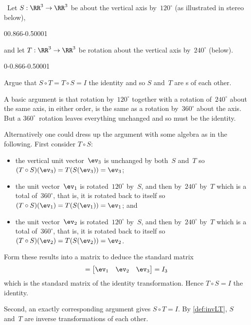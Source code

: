 \begin{example} \ 
Let \(S:\RR^3\to\RR^3\) be  about the vertical axis by~\(120^\circ\) (as illustrated in stereo below), 
\begin{center}
0{0.866}{-0.5}0001
\end{center}
and let \(T:\RR^3\to\RR^3\) be rotation about the vertical axis by~\(240^\circ\) (below).
\begin{center}
0{-0.866}{-0.5}0001
\end{center}
Argue that \(S\circ T=T\circ S=I\) the identity and so \(S\) 
and~\(T\) are s of each other.
\begin{solution} 
A basic argument is that rotation by~\(120^\circ\) together with a rotation of~\(240^\circ\) about the same axis, in either order, is the same as a rotation by~\(360^\circ\) about the axis.
But a \(360^\circ\)~rotation leaves everything unchanged and so must be the identity.

Alternatively one could dress up the argument with some algebra as in the following.
First consider \(T\circ S\):
\begin{itemize}
\item the vertical unit vector~\(\ev_3\) is unchanged by both~\(S\) and~\(T\) so \((T\circ S)(\ev_3)=T(S(\ev_3))=\ev_3\);
\item the unit vector~\(\ev_1\) is rotated~\(120^\circ\) by~\(S\), and then by~\(240^\circ\) by~\(T\) which is a total of~\(360^\circ\), that is, it is rotated back to itself so \((T\circ S)(\ev_1)=T(S(\ev_1))=\ev_1\); and
\item the unit vector~\(\ev_2\) is rotated~\(120^\circ\) by~\(S\), and then by~\(240^\circ\) by~\(T\) which is a total of~\(360^\circ\), that is, it is rotated back to itself so \((T\circ S)(\ev_2)=T(S(\ev_2))=\ev_2\).
\end{itemize}
Form these results into a matrix to deduce the standard matrix
\begin{equation*}
[T\circ S]=\begin{bmatrix} \ev_1&\ev_2&\ev_3 \end{bmatrix}
=I_3
\end{equation*}
which is the standard matrix of the identity transformation.
Hence \(T\circ S=I\) the identity.

Second, an exactly corresponding argument gives  \(S\circ T=I\).
By \cref{def:invLT}, \(S\) and~\(T\) are inverse transformations of each other.
\end{solution}
\end{example}




